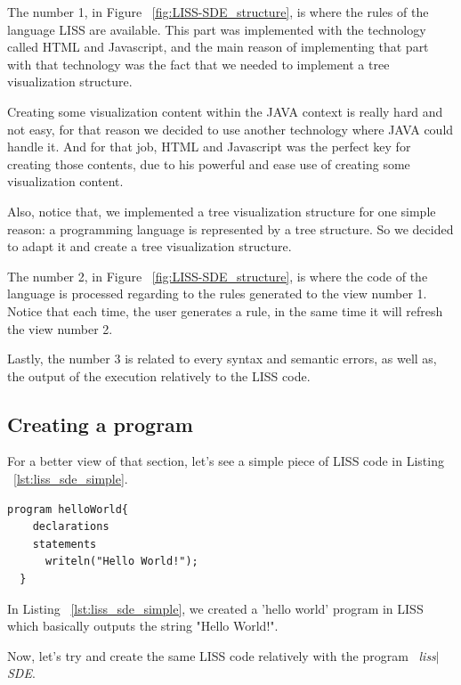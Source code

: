 \documentclass[
  oneside,
  11pt, a4paper,
  footinclude=true,
  headinclude=true,
  cleardoublepage=empty
]{scrbook}
\begin{document}
The number 1, in Figure ~\ref{fig:LISS-SDE_structure}, is where the rules of the language LISS are available. This part was implemented with the technology called HTML and Javascript, and the main reason of implementing that part with that technology was the fact that we needed to implement a tree visualization structure. 

Creating some visualization content within the JAVA context is really hard and not easy, for that reason we decided to use another technology where JAVA could handle it. And for that job, HTML and Javascript was the perfect key for creating those contents, due to his powerful and ease use of creating some visualization content.

Also, notice that, we implemented a tree visualization structure for one simple reason: a programming language is represented by a tree structure. So we decided to adapt it and create a tree visualization structure.

The number 2, in Figure ~\ref{fig:LISS-SDE_structure}, is where the code of the language is processed regarding to the rules generated to the view number 1. Notice that each time, the user generates a rule, in the same time it will refresh the view number 2.

Lastly, the number 3 is related to every syntax and semantic errors, as well as, the output of the execution relatively to the LISS code.

\subsection{Creating a program}

For a better view of that section, let's see a simple piece of LISS code in Listing ~\ref{lst:liss_sde_simple}.

\begin{lstlisting}[caption={LISS code},label={lst:liss_sde_simple}]
  program helloWorld{
    declarations
    statements
      writeln("Hello World!");
  }
\end{lstlisting}

In Listing ~\ref{lst:liss_sde_simple}, we created a 'hello world' program in LISS which basically outputs the string "Hello World!".

Now, let's try and create the same LISS code relatively with the program ~\textit{liss$|$SDE}.

\end{document}
